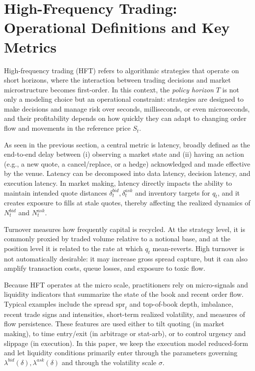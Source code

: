 \documentclass[a4paper,10pt,titlepage,oneside,openany]{book}
\theoremstyle{plain}\newtheorem{theorem}{Theorem}[chapter]
\theoremstyle{definition}\newtheorem{definition}{Definition}[chapter]
\theoremstyle{remark}\newtheorem{remark}{Remark}[chapter]
\begin{document}
\section{High-Frequency Trading: Operational Definitions and Key Metrics}
High-frequency trading (HFT) refers to algorithmic strategies that operate on short horizons, where the interaction between trading decisions and market microstructure becomes first-order. In this context, the \emph{policy horizon} $T$ is not only a modeling choice but an operational constraint: strategies are designed to make decisions and manage risk over seconds, milliseconds, or even microseconds, and their profitability depends on how quickly they can adapt to changing order flow and movements in the reference price $S_t$.

As seen in the previous section, a central metric is latency, broadly defined as the end-to-end delay between (i) observing a market state and (ii) having an action (e.g., a new quote, a cancel/replace, or a hedge) acknowledged and made effective by the venue. Latency can be decomposed into data latency, decision latency, and execution latency. In market making, latency directly impacts the ability to maintain intended quote distances $\delta_t^{bid},\delta_t^{ask}$ and inventory targets for $q_t$, and it creates exposure to fills at stale quotes, thereby affecting the realized dynamics of $N_t^{bid}$ and $N_t^{ask}$.

Turnover measures how frequently capital is recycled. At the strategy level, it is commonly proxied by traded volume relative to a notional base, and at the position level it is related to the rate at which $q_t$ mean-reverts. High turnover is not automatically desirable: it may increase gross spread capture, but it can also amplify transaction costs, queue losses, and exposure to toxic flow.

Because HFT operates at the micro scale, practitioners rely on micro-signals and liquidity indicators that summarize the state of the book and recent order flow. Typical examples include the spread $\mathrm{spr}_t$ and top-of-book depth, imbalance, recent trade signs and intensities, short-term realized volatility, and measures of flow persistence. These features are used either to tilt quoting (in market making), to time entry/exit (in arbitrage or stat-arb), or to control urgency and slippage (in execution). In this paper, we keep the execution model reduced-form and let liquidity conditions primarily enter through the parameters governing $\lambda^{bid}(\delta),\lambda^{ask}(\delta)$ and through the volatility scale $\sigma$.
\end{document}
